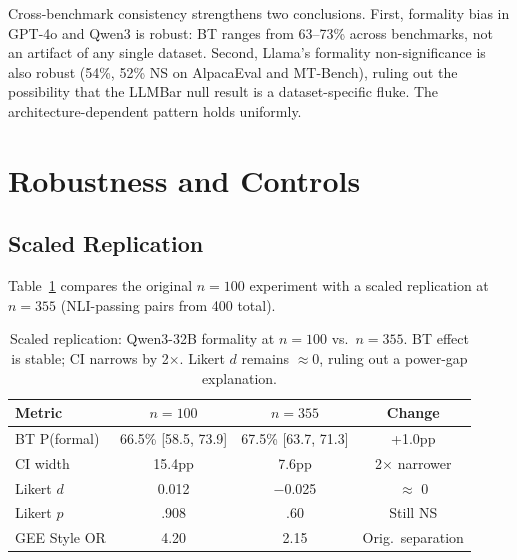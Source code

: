 \documentclass[11pt,a4paper]{article}
\begin{document}
Cross-benchmark consistency strengthens two conclusions. First, formality bias in GPT-4o and Qwen3 is robust: BT ranges from 63--73\% across benchmarks, not an artifact of any single dataset. Second, Llama's formality non-significance is also robust (54\%, 52\% NS on AlpacaEval and MT-Bench), ruling out the possibility that the LLMBar null result is a dataset-specific fluke. The architecture-dependent pattern holds uniformly.

\section{Robustness and Controls}

\subsection{Scaled Replication}
\label{sec:scaled}

Table~\ref{tab:scaled} compares the original $n = 100$ experiment with a scaled replication at $n = 355$ (NLI-passing pairs from 400 total).

\begin{table}[t]
\centering
\small
\caption{Scaled replication: Qwen3-32B formality at $n = 100$ vs.\ $n = 355$. BT effect is stable; CI narrows by 2$\times$. Likert $d$ remains $\approx 0$, ruling out a power-gap explanation.}
\label{tab:scaled}
\begin{tabular}{lccc}
\toprule
\textbf{Metric} & $n = 100$ & $n = 355$ & \textbf{Change} \\
\midrule
BT P(formal)   & 66.5\% [58.5, 73.9] & 67.5\% [63.7, 71.3] & +1.0pp \\
CI width        & 15.4pp              & 7.6pp                & 2$\times$ narrower \\
Likert $d$      & 0.012               & $-$0.025             & $\approx$ 0 \\
Likert $p$      & .908                & .60                  & Still NS \\
GEE Style OR    & 4.20                & 2.15                 & Orig.\ separation \\
\bottomrule
\end{tabular}
\end{table}
\end{document}
